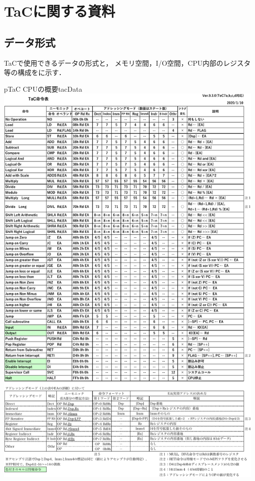 \chapter{TaCに関する資料}
\label{appTac}

\section{データ形式}
TaCで使用できるデータの形式と，
メモリ空間，I/O空間，CPU内部のレジスタ等の構成をに示す．

\begin{myfig}{p}{TaC CPUの概要}{tacData}
  \includegraphics[scale=0.9,page=2]{Fig/TaCInst-crop.pdf}
\end{myfig}

